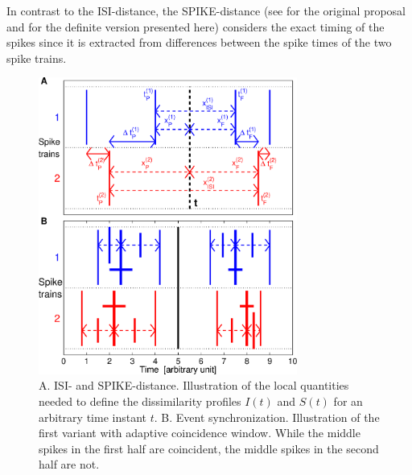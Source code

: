 \documentclass[10pt,twocolumn]{elsart5p}
\begin{document}
In contrast to the ISI-distance, the SPIKE-distance (see \citet{Kreuz11} for the original proposal and \citet{Kreuz13, Kreuz12} for the definite version presented here) considers the exact timing of the spikes since it is extracted from differences between the spike times of the two spike trains. 
%
%
\begin{figure}
    \includegraphics[width=85mm]{ISI_SPIKE_ES_ILLU.eps}
    \caption{\abb\label{fig:ISI-SPIKE-ES-Illustration} A.  ISI- and SPIKE-distance. Illustration of the local quantities needed to define the dissimilarity profiles $I (t)$ and $S (t)$ for an arbitrary time instant $t$.    B. Event synchronization. Illustration of the first variant with adaptive coincidence window. While the middle spikes in the first half are coincident, the middle spikes in the second half are not.}
\end{figure}
%
\end{document}
